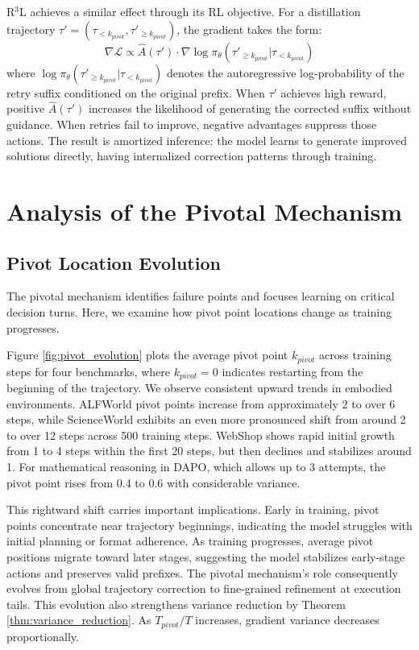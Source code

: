 \documentclass[11pt]{article}
\theoremstyle{definition}
\theoremstyle{remark}
\begin{document}
R$^3$L achieves a similar effect through its RL objective. For a distillation trajectory $\tau' = (\tau_{<k_{pivot}}, \tau'_{\geq k_{pivot}})$, the gradient takes the form:
\begin{equation}
\nabla \mathcal{L} \propto \hat{A}(\tau') \cdot \nabla \log \pi_{\theta}(\tau'_{\geq k_{pivot}} | \tau_{<k_{pivot}})
\end{equation}
where $\log \pi_{\theta}(\tau'_{\geq k_{pivot}} | \tau_{<k_{pivot}})$ denotes the autoregressive log-probability of the retry suffix conditioned on the original prefix. When $\tau'$ achieves high reward, positive $\hat{A}(\tau')$ increases the likelihood of generating the corrected suffix without guidance. When retries fail to improve, negative advantages suppress those actions. The result is amortized inference: the model learns to generate improved solutions directly, having internalized correction patterns through training.

\section{Analysis of the Pivotal Mechanism}
\label{sec:pivot_analysis}

\subsection{Pivot Location Evolution}

The pivotal mechanism identifies failure points and focuses learning on critical decision turns. Here, we examine how pivot point locations change as training progresses.



Figure \ref{fig:pivot_evolution} plots the average pivot point $k_{pivot}$ across training steps for four benchmarks, where $k_{pivot} = 0$ indicates restarting from the beginning of the trajectory. We observe consistent upward trends in embodied environments. ALFWorld pivot points increase from approximately 2 to over 6 steps, while ScienceWorld exhibits an even more pronounced shift from around 2 to over 12 steps across 500 training steps. WebShop shows rapid initial growth from 1 to 4 steps within the first 20 steps, but then declines and stabilizes around 1. For mathematical reasoning in DAPO, which allows up to 3 attempts, the pivot point rises from 0.4 to 0.6 with considerable variance.

This rightward shift carries important implications. Early in training, pivot points concentrate near trajectory beginnings, indicating the model struggles with initial planning or format adherence. As training progresses, average pivot positions migrate toward later stages, suggesting the model stabilizes early-stage actions and preserves valid prefixes. The pivotal mechanism's role consequently evolves from global trajectory correction to fine-grained refinement at execution tails. This evolution also strengthens variance reduction by Theorem \ref{thm:variance_reduction}. As $T_{pivot}/T$ increases, gradient variance decreases proportionally.
\end{document}
